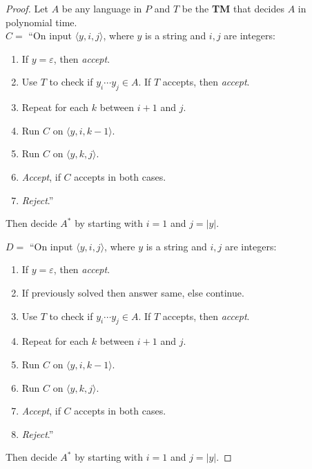 \documentclass[11pt]{article}
\begin{document}
\begin{proof}Let $A$ be any language in $P$ and $T$ be the \textbf{TM} that decides $A$ in polynomial time. \\

$C =$ \textquotedblleft On input $\langle y, i, j \rangle$, where $y$ is a string and $i, j$ are integers:
\begin{enumerate}
\item If $y = \varepsilon$, then \textit{accept}.
\item Use $T$ to check if $y_i \cdots y_j \in A$. If $T$ accepts, then \textit{accept}.
\item Repeat for each $k$ between $i+1$ and $j$.
\item \hspace*{0.5cm} Run $C$ on $\langle y, i, k - 1 \rangle$.
\item \hspace*{0.5cm} Run $C$ on $\langle y, k, j \rangle$.
\item \hspace*{0.5cm} \textit{Accept}, if $C$ accepts in both cases.
\item \textit{Reject}.\textquotedblright
\end{enumerate}
Then decide $A^{*}$ by starting with $i=1$ and $j=|y|$.

$D =$ \textquotedblleft On input $\langle y, i, j \rangle$, where $y$ is a string and $i, j$ are integers:
\begin{enumerate}
\item If $y = \varepsilon$, then \textit{accept}.
\item If previously solved then answer same, else continue.
\item Use $T$ to check if $y_i \cdots y_j \in A$. If $T$ accepts, then \textit{accept}.
\item Repeat for each $k$ between $i+1$ and $j$.
\item \hspace*{0.5cm} Run $C$ on $\langle y, i, k - 1 \rangle$.
\item \hspace*{0.5cm} Run $C$ on $\langle y, k, j \rangle$.
\item \hspace*{0.5cm} \textit{Accept}, if $C$ accepts in both cases.
\item \textit{Reject}.\textquotedblright
\end{enumerate}
Then decide $A^{*}$ by starting with $i=1$ and $j=|y|$.


\end{proof}
\end{document}
